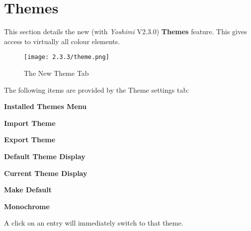 %
%
%

\section{Themes}
\label{sec:themes}

   This section details the new (with \textsl{Yoshimi} V2.3.0) \textbf{Themes}
   feature. This gives access to virtually all colour elements.


\begin{figure}[H]
   \centering
   \texttt{[image: 2.3.3/theme.png]}
   \caption[Theme Options]{The New Theme Tab}
   \label{fig:yoshimi_settings_themes}
\end{figure}

   The following items are provided by the Theme settings tab:

   \begin{enumber}
      \item \textbf{Installed Themes Menu}
      \item \textbf{Import Theme}
      \item \textbf{Export Theme}
      \item \textbf{Default Theme Display}
      \item \textbf{Current Theme Display}
      \item \textbf{Make Default}
      \item \textbf{Monochrome}
   \end{enumber}

   \setcounter{ItemCounter}{0}      %

    {}A click on an entry will immediately switch
   to that theme.

